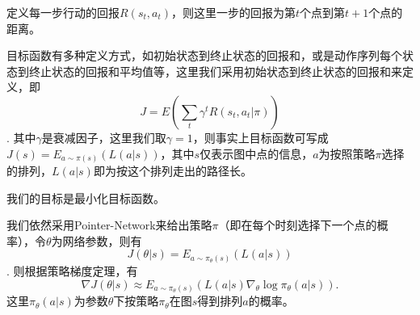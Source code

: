 \documentclass[a4paper]{article}
\begin{document}
定义每一步行动的回报$R\left(s_t,a_t\right)$，则这里一步的回报为第$t$个点到第$t+1$个点的距离。

目标函数有多种定义方式，如初始状态到终止状态的回报和，或是动作序列每个状态到终止状态的回报和平均值等，这里我们采用初始状态到终止状态的回报和来定义，即
$$J=E\left(\sum_t\gamma^tR\left(s_t,a_t|\pi\right)\right)$$.
其中$\gamma$是衰减因子，这里我们取$\gamma=1$，则事实上目标函数可写成$J\left(s\right)=E_{a\sim \pi\left(s\right)}\left(L\left(a|s\right)\right)$，其中$s$仅表示图中点的信息，$a$为按照策略$\pi$选择的排列，$L\left(a|s\right)$即为按这个排列走出的路径长。

我们的目标是最小化目标函数。

我们依然采用Pointer-Network来给出策略$\pi$（即在每个时刻选择下一个点的概率），令$\theta$为网络参数，则有
$$J\left(\theta |s\right)=E_{a\sim \pi_\theta\left(s\right)}\left(L\left(a|s\right)\right)$$.
则根据策略梯度定理，有
$$\nabla J\left(\theta|s\right)\approx E_{a\sim \pi_\theta\left(s\right)}\left(L\left(a|s\right)\nabla_\theta\log \pi_\theta\left(a|s\right)\right). $$
这里$\pi_\theta\left(a|s\right)$为参数$\theta$下按策略$\pi_\theta$在图$s$得到排列$a$的概率。
\end{document}
